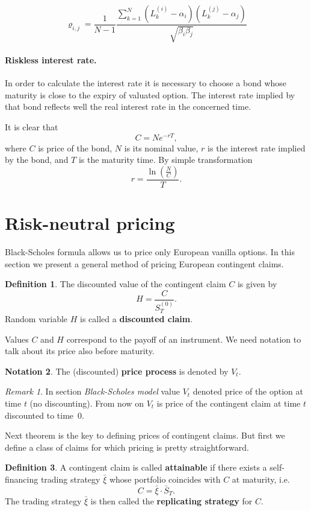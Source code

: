 \documentclass[a4paper,11pt, twoside]{book}
\theoremstyle{definition}
\newtheorem{mydef}{Definition}[chapter]
\newtheorem{notation}[mydef]{Notation}
\theoremstyle{remark}
\newtheorem{remark}{Remark}[chapter]
\def\Sa{\bar{S}}
\def\xia{\bar{\xi}}
\begin{document}
\[ \varrho_{i,j} = \frac{1}{N-1} \frac{\sum\limits_{k=1}^N(L^{(i)}_k - \alpha_i)(L^{(j)}_k - \alpha_j)}{\sqrt{\beta_i \beta_j}} \]

\paragraph{Riskless interest rate.}
In order to calculate the interest rate it is necessary to choose a bond whose maturity is close to the expiry of valuated option. The interest rate implied by that bond reflects well the real interest rate in the concerned time.

It is clear that
\[ C = Ne^{-rT}, \]
where $C$ is price of the bond, $N$ is its nominal value, $r$ is the interest rate implied by the bond, and $T$ is the maturity time. By simple transformation
\begin{equation*}
r = \dfrac{\ln(\frac{N}{C})}{T}.
\end{equation*}

\section{Risk-neutral pricing}
\label{sec:risk-neutral}
Black-Scholes formula allows us to price only European vanilla options. In this section we present a general method of pricing European contingent claims. 
\begin{mydef}
 The discounted value of the contingent claim $C$ is given by
 \begin{equation*}
  H = \frac{C}{S^{(0)}_T}.
 \end{equation*}
 Random variable $H$ is called a \textbf{discounted claim}.
\end{mydef}

Values $C$ and $H$ correspond to the payoff of an instrument. We need notation to talk about its price also before maturity.
\begin{notation}
 The (discounted) \textbf{price process} is denoted by $V_t$. 
\end{notation}
\begin{remark}
 In section \textit{Black-Scholes model} value $V_t$ denoted price of the option at time $t$ (no discounting). From now on $V_t$ is price of the contingent claim at time $t$ discounted to time~$0$.
\end{remark}

Next theorem is the key to defining prices of contingent claims. But first we define a class of claims for which pricing is pretty straightforward. 
\begin{mydef}
 A contingent claim is called \textbf{attainable} if there exists a self-financing trading strategy $\xia$ whose portfolio coincides with $C$ at maturity, i.e.
 \[ C = \xia \cdot \Sa_T. \]
 The trading strategy $\xia$ is then called the \textbf{replicating strategy} for $C$.
\end{mydef}
\end{document}
